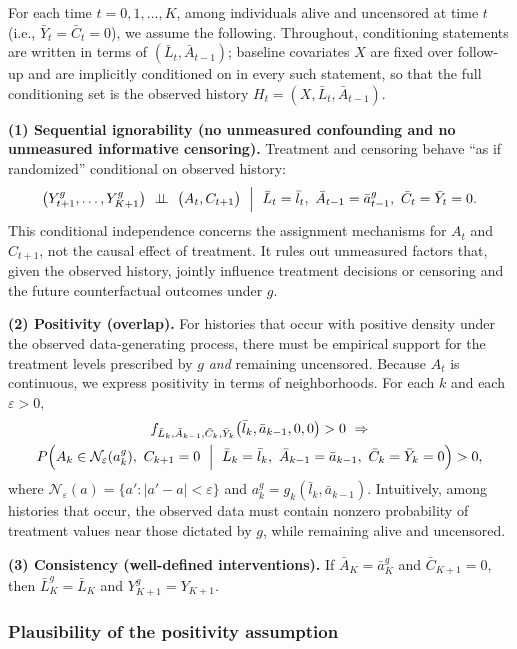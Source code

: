 For each time $t=0,1,\ldots,K$, among individuals alive and uncensored at time $t$
(i.e., $\bar Y_t=\bar C_t=0$), we assume the following. Throughout, conditioning statements
are written in terms of $(\bar L_t,\bar A_{t-1})$; baseline covariates $X$ are fixed over
follow-up and are implicitly conditioned on in every such statement, so that the full
conditioning set is the observed history $H_t=(X,\bar L_t,\bar A_{t-1})$.

\textbf{(1) Sequential ignorability (no unmeasured confounding and no unmeasured informative censoring).}
Treatment and censoring behave ``as if randomized'' conditional on observed history:
\begin{equation}
\bigl(Y^g_{t+1},\ldots,Y^g_{K+1}\bigr)
\ \perp\!\!\!\perp\ 
\bigl(A_t, C_{t+1}\bigr)
\ \Bigm|\ 
\bar L_t=\bar l_t,\ \bar A_{t-1}=\bar a^g_{t-1},\ \bar C_t=\bar Y_t=0.
\end{equation}
This conditional independence concerns the assignment mechanisms for $A_t$ and
$C_{t+1}$, not the causal effect of treatment. It rules out unmeasured factors that,
given the observed history, jointly influence treatment decisions or censoring and the
future counterfactual outcomes under $g$.

\textbf{(2) Positivity (overlap).}
For histories that occur with positive density under the observed data-generating
process, there must be empirical support for the treatment levels prescribed by $g$
\emph{and} remaining uncensored. Because $A_t$ is continuous, we express positivity in
terms of neighborhoods. For each $k$ and each $\varepsilon>0$,
\begin{multline}
f_{\bar L_k,\bar A_{k-1},\bar C_k,\bar Y_k}\bigl(\bar l_k,\bar a_{k-1},0,0\bigr)>0
\ \Rightarrow\\
P\!\left(A_k \in \mathcal N_\varepsilon(a_k^g),\ C_{k+1}=0
\ \Bigm|\ \bar L_k=\bar l_k,\ \bar A_{k-1}=\bar a_{k-1},\ \bar C_k=\bar Y_k=0\right)>0,
\end{multline}
where $\mathcal N_\varepsilon(a)=\{a':|a'-a|<\varepsilon\}$ and
$a_k^g=g_k(\bar l_k,\bar a_{k-1})$. Intuitively, among histories that occur, the observed
data must contain nonzero probability of treatment values near those dictated by $g$,
while remaining alive and uncensored.

\textbf{(3) Consistency (well-defined interventions).}
If $\bar A_K=\bar a_K^g$ and $\bar C_{K+1}=0$, then $\bar L_K^g=\bar L_K$ and
$Y_{K+1}^g=Y_{K+1}$.

\subsubsection*{Plausibility of the positivity assumption}\label{sec:positivity}

